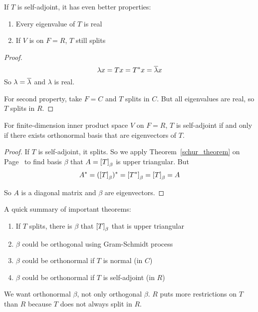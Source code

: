 If $T$ is self-adjoint, it has even better properties:
\begin{enumerate}
    \item Every eigenvalue of $T$ is real
    \item If $V$ is on $F=R$, $T$ still splits
\end{enumerate}
\begin{proof}
    \begin{equation*}
        \lambda x = Tx = T^* x = \overline{\lambda} x
    \end{equation*}
    So $\lambda = \overline{\lambda}$ and $\lambda$ is real.
    
    For second property, take $F=C$ and $T$ splits in $C$. But all eigenvalues are real, so $T$ splits in $R$.
\end{proof}

\begin{theorem}
    For finite-dimension inner product space $V$ on $F=R$, $T$ is self-adjoint if and only if there exists orthonormal basis that are eigenvectors of $T$.
\end{theorem}
\begin{proof}
    If $T$ is self-adjoint, it splits. So we apply Theorem~\ref{schur_theorem} on Page~\pageref{schur_theorem} to find basis $\beta$ that $A = \coordinate{T}_\beta$ is upper triangular. But
    \begin{equation*}
        A^* = (\coordinate{T}_\beta)^* = \coordinate{T^*}_\beta = \coordinate{T}_\beta = A
    \end{equation*}
    
    So $A$ is a diagonal matrix and $\beta$ are eigenvectors.
\end{proof}

A quick summary of important theorems:
\begin{enumerate}
    \item If $T$ splits, there is $\beta$ that $\coordinate{T}_\beta$ that is upper triangular
    \item $\beta$ could be orthogonal using Gram-Schmidt process
    \item $\beta$ could be orthonormal if $T$ is normal (in $C$)
    \item $\beta$ could be orthonormal if $T$ is self-adjoint (in $R$)
\end{enumerate}

We want orthonormal $\beta$, not only orthogonal $\beta$. $R$ puts more restrictions on $T$ than $R$ because $T$ does not always split in $R$.

